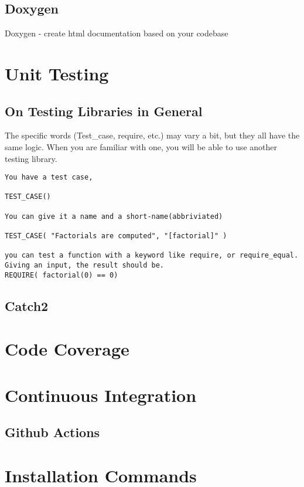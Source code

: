 \documentclass[openany]{report}
\begin{document}
\subsection{Doxygen}

Doxygen - create html documentation based on your codebase

\section{Unit Testing}

\subsection{On Testing Libraries in General}

The specific words (Test\_case, require, etc.) may vary a bit,
but they all have the same logic. When you are familiar with one, 
you will be able to use another testing library.

\begin{verbatim}
You have a test case, 

TEST_CASE()

You can give it a name and a short-name(abbriviated)

TEST_CASE( "Factorials are computed", "[factorial]" )

you can test a function with a keyword like require, or require_equal. Giving an input, the result should be. 
REQUIRE( factorial(0) == 0)
\end{verbatim}

\subsection{Catch2}

\section{Code Coverage}

\section{Continuous Integration}

\subsection{Github Actions}



\section{Installation Commands}
\end{document}
